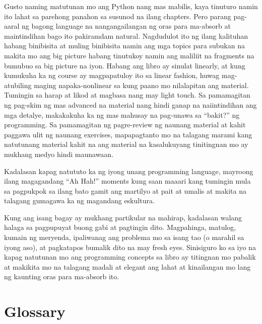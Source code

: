 \documentclass[10pt,]{book}
\begin{document}
Gusto naming matutunan mo ang Python nang mas mabilis, kaya tinuturo
namin ito lahat sa parehong panahon sa susunod na ilang chapters. Pero
parang pag-aaral ng bagong language na nangangailangan ng oras para
ma-absorb at maintindihan bago ito pakiramdam natural. Nagdudulot ito ng
ilang kalituhan habang binibisita at muling binibisita namin ang mga
topics para subukan na makita mo ang big picture habang tinutukoy namin
ang maliliit na fragments na bumubuo sa big picture na iyon. Habang ang
libro ay sinulat linearly, at kung kumukuha ka ng course ay magpapatuloy
ito sa linear fashion, huwag mag-atubiling maging napaka-nonlinear sa
kung paano mo nilalapitan ang material. Tumingin sa harap at likod at
magbasa nang may light touch. Sa pamamagitan ng pag-skim ng mas advanced
na material nang hindi ganap na naiintindihan ang mga detalye,
makakakuha ka ng mas mahusay na pag-unawa sa ``bakit?'' ng programming.
Sa pamamagitan ng pagre-review ng naunang material at kahit paggawa ulit
ng naunang exercises, mapapagtanto mo na talagang marami kang natutunang
material kahit na ang material na kasalukuyang tinitingnan mo ay mukhang
medyo hindi maunawaan.

Kadalasan kapag natututo ka ng iyong unang programming language,
mayroong ilang magagandang ``Ah Hah!'' moments kung saan maaari kang
tumingin mula sa pagpukpok sa ilang bato gamit ang martilyo at pait at
umalis at makita na talagang gumagawa ka ng magandang eskultura.

Kung ang isang bagay ay mukhang partikular na mahirap, kadalasan walang
halaga sa pagpupuyat buong gabi at pagtingin dito. Magpahinga, matulog,
kumain ng meryenda, ipaliwanag ang problema mo sa isang tao (o marahil
sa iyong aso), at pagkatapos bumalik dito na may fresh eyes. Sinisiguro
ko sa iyo na kapag natutunan mo ang programming concepts sa libro ay
titingnan mo pabalik at makikita mo na talagang madali at elegant ang
lahat at kinailangan mo lang ng kaunting oras para ma-absorb ito.

\section{Glossary}\label{glossary}
\end{document}
